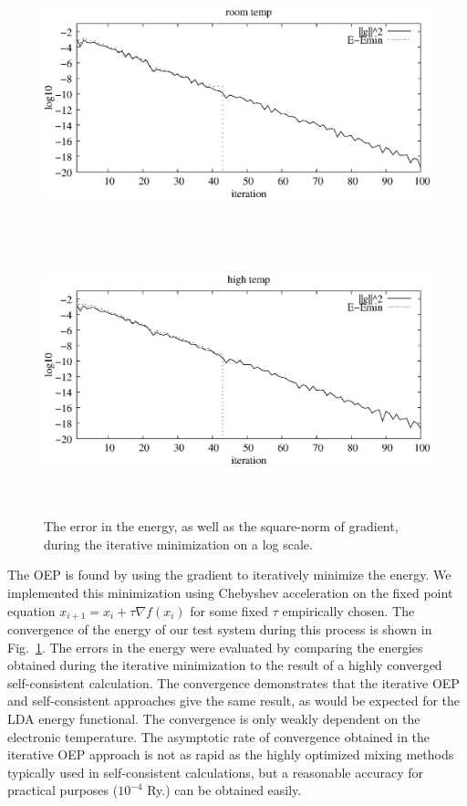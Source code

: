 \documentclass{article}
\begin{document}
\begin{figure}[p]
\includegraphics[height=3in]{cvg_room.eps}
\includegraphics[height=3in]{cvg_1eV.eps}
\caption{The error in the energy, as well as the square-norm of gradient,
during the iterative minimization on a log scale.}
\label{energy_convergence}
\end{figure}

The OEP is found by using the gradient to iteratively minimize the energy.  We implemented this
minimization using Chebyshev acceleration on the fixed point equation
$x_{i+1} = x_i + \tau \nabla f(x_i)$ for some fixed $\tau$ empirically chosen.
The convergence of the energy of our test
system during this process is shown in Fig.~\ref{energy_convergence}.  The errors
in the energy were evaluated by comparing the energies obtained during the iterative minimization
to the result of a highly converged self-consistent calculation.  The convergence demonstrates
that the iterative OEP and self-consistent approaches give the same result, as would be expected
for the LDA energy functional.  The convergence is only weakly dependent on the electronic
temperature.  The asymptotic rate of convergence obtained in the iterative OEP approach is
not as rapid as the highly optimized mixing methods typically used in self-consistent calculations,
but a reasonable accuracy for practical purposes ($10^{-4}$ Ry.) can be obtained easily.
\end{document}
